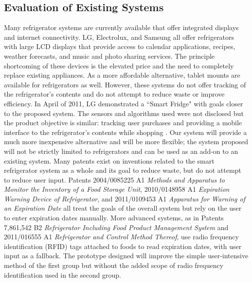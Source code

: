 \documentclass[11pt]{article} %
\begin{document}
\subsection{Evaluation of Existing Systems}
Many refrigerator systems are currently available that offer integrated displays and internet connectivity. LG, Electrolux, and Samsung all offer refrigerators with large LCD displays that provide access to calendar applications, recipes, weather forecasts, and music and photo sharing services. The principle shortcoming of these devices is the elevated price and the need to completely replace existing appliances. As a more affordable alternative, tablet mounts are available for refrigerators as well.
However, these systems do not offer tracking of the refrigerator's contents and do not attempt to reduce waste or improve efficiency. In April of 2011, LG demonstrated a ``Smart Fridge" with goals closer to the proposed system. The sensors and algorithms used were not disclosed but the product objective is similar: tracking user purchases and providing a mobile interface to the refrigerator's contents while shopping \cite{lg}. Our system will provide a much more inexpensive alternative and will be more flexible; the system proposed will not be strictly limited to refrigerators and can be used as an add-on to an existing system.
\newline \quad \newline
Many patents exist on inventions related to the smart refrigerator system as a whole and its goal to reduce waste, but do not attempt to reduce user input. Patents 2004/0085225 A1 \emph{Methods and Apparatus to Monitor the Inventory of a Food Storage Unit}, 2010/0148958 A1 \emph{Expiration Warning Device of Refrigerator}, and 2011/0109453 A1 \emph{Apparatus for Warning of an Expiration Date} all treat the goals of the overall system but rely on the user to enter expiration dates manually. More advanced systems, as in Patents 7,861,542 B2 \emph{Refrigerator Including Food Product Management System} and 2011/016555 A1 \emph {Refrigerator and Control Method Thereof}, use radio frequency identification (RFID) tags attached to foods to read expiration dates, with user input as a fallback. The prototype designed will improve the simple user-intensive method of the first group but without the added scope of radio frequency identification used in the second group.
\end{document}
